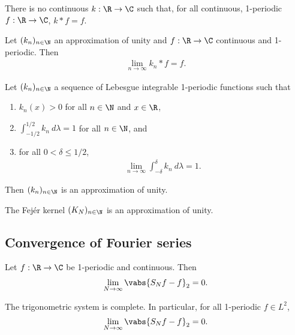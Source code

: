 \documentclass{article}
\begin{document}
\begin{lemma}
	There is no continuous $k:\R\to\C$ such that, for all continuous, 1-periodic $f:\R\to\C$,
	$k*f=f$.
\end{lemma}

\begin{lemma}
	Let $(k_n)_{n\in\N}$ an approximation of unity and $f:\R\to\C$ continuous and 1-periodic. Then 
	\begin{align*}
		\lim_{n\to\infty} k_n * f = f.
	\end{align*}
\end{lemma}

\begin{theorem}[Notes 5.6]
	Let $(k_n)_{n\in\N}$ a sequence of Lebesgue integrable 1-periodic functions such that
	\begin{enumerate}
		\item $k_n(x)>0$ for all $n\in\N$ and $x\in\R$,
		\item $\int_{-1/2}^{1/2} k_n\:d\lambda = 1$ for all $n\in\N$, and 
		\item for all $0<\delta\leq 1/2$, \begin{align*}
			\lim_{n\to\infty}\int_{-\delta}^\delta k_n\:d\lambda = 1.
		\end{align*}
	\end{enumerate}
	Then $(k_n)_{n\in\N}$ is an approximation of unity.
\end{theorem}

\begin{corollary}
	The Fej\'er kernel $(K_N)_{n\in\N}$ is an approximation of unity.
\end{corollary}

\subsection{Convergence of Fourier series}

\begin{lemma}[Notes 5.5]
	Let $f:\R\to\C$ be 1-periodic and continuous. Then 
	\begin{align*}
		\lim_{N\to\infty} \vabs{S_Nf-f}_2 = 0.
	\end{align*}	
\end{lemma}

\begin{theorem}[Notes 5.7]
	The trigonometric system is complete. In particular, for all 1-periodic $f\in L^2$,	
	\begin{align*}
		\lim_{N\to\infty}\vabs{S_Nf-f}_2=0.
	\end{align*}
\end{theorem}
\end{document}
